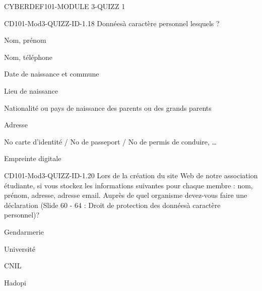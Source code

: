 \documentclass[12pt]{article}
\begin{document}
\begin{quiz}{CYBERDEF101-MODULE 3-QUIZZ 1}
\begin{multi}[multiple=true]{CD101-Mod3-QUIZZ-ID-1.18}
	 Donn\'ees\`a caract\`ere personnel lesquels ?
\item*	Nom, pr\'enom
\item* 	Nom, t\'el\'ephone
\item* 	Date de naissance et commune
\item* 	Lieu de naissance
\item* 	Nationalit\'e ou pays de naissance des parents ou des grands parents
\item* 	Adresse
\item* 	No carte d'identit\'e / No de passeport / No de permis de conduire, …
\item* 	Empreinte digitale
\end{multi}

\begin{multi}[multiple=true]{CD101-Mod3-QUIZZ-ID-1.20}
	Lors de la cr\'eation du site Web de notre association \'etudiante, si vous stockez les informations suivantes pour chaque membre : nom, pr\'enom, adresse, adresse email. Aupr\`es de quel organisme devez-vous faire une d\'eclaration (Slide 60 - 64 : Droit de protection des donn\'ees\`a caract\`ere personnel)?
\item 	Gendarmerie
\item 	Universit\'e
\item* 	CNIL
\item 	Hadopi
\end{multi}
  \end{quiz}
   
\end{document}
